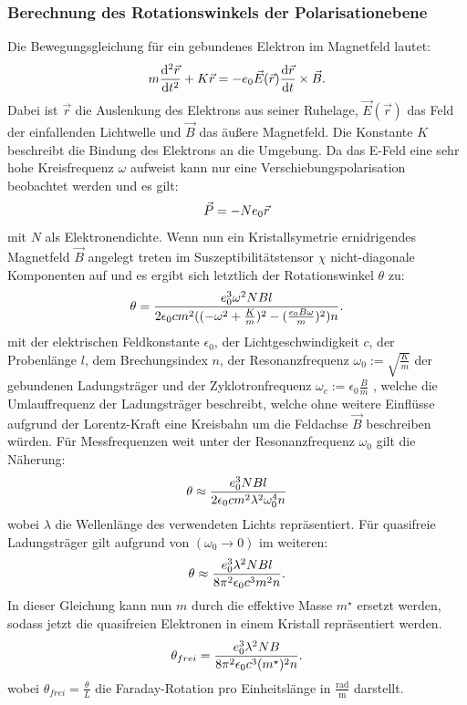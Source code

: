 \subsubsection{Berechnung des Rotationswinkels der Polarisationebene}
\label{sec:rotationsweinkel}
Die Bewegungsgleichung für ein gebundenes Elektron im Magnetfeld lautet:
\begin{equation}
  m\frac{\mathrm{d}^2 \vec{r}}{\mathrm{d}t^2}+K\vec{r}=-e_0\vec{E}(\vec{r})\frac{\mathrm{d} \vec{r}}{\mathrm{d}t}\times \vec{B}.\\
\end{equation}
Dabei ist $\vec{r}$ die Auslenkung des Elektrons aus seiner Ruhelage, $\vec{E}(\vec{r})$ das Feld der einfallenden Lichtwelle
und $\vec{B}$ das äußere Magnetfeld. Die Konstante $K$ beschreibt die Bindung des Elektrons an die Umgebung. Da das E-Feld eine
sehr hohe Kreisfrequenz $\omega$ aufweist kann nur eine Verschiebungspolarisation beobachtet werden und es gilt:
\begin{equation}
  \vec{P}=-Ne_0 \vec{r}\\
\end{equation} 
mit $N$ als Elektronendichte. Wenn nun ein Kristallsymetrie ernidrigendes Magnetfeld $\vec{B}$ angelegt treten im Suszeptibilitätstensor
$\chi$ nicht-diagonale Komponenten auf und es ergibt sich letztlich der Rotationswinkel $\theta$ zu:
\begin{equation}
  \theta = \frac{e_0^3 \omega^2 NBl}{2\epsilon_0 cm^2((-\omega^2+\frac{K}{m})^2-(\frac{e_0B\omega}{m})^2)n}.\\
\end{equation}
mit der elektrischen Feldkonstante $\epsilon_0$, der Lichtgeschwindigkeit $c$, der Probenlänge $l$, dem
Brechungsindex $n$, der Resonanzfrequenz $\omega_0:= \sqrt{\frac{K}{m}}$ der gebundenen Ladungsträger
und der Zyklotronfrequenz $\omega_c:=\epsilon_0\frac{B}{m}$ , welche die Umlauffrequenz der Ladungsträger
beschreibt, welche ohne weitere Einflüsse aufgrund der Lorentz-Kraft eine Kreisbahn um
die Feldachse $\vec{B}$ beschreiben würden. Für Messfrequenzen weit unter der Resonanzfrequenz
$\omega_0$ gilt die Näherung:
\begin{equation}
  \theta \approx \frac{e_0^3 NBl}{2\epsilon_0cm^2\lambda^2\omega_0^4n}\\
\end{equation}
wobei $\lambda$ die Wellenlänge des verwendeten Lichts repräsentiert. Für quasifreie Ladungsträger gilt aufgrund von $(\omega_0\rightarrow 0)$ im weiteren:
\begin{equation}
  \theta \approx \frac{e_0^3\lambda^2NBl}{8\pi^2\epsilon_0c^3m^2n}.\\
\end{equation}
In dieser Gleichung kann nun $m$ durch die effektive Masse $m^{\star}$ ersetzt werden, sodass jetzt  die quasifreien Elektronen in einem Kristall repräsentiert werden.
\begin{equation}
  \theta_{frei}=\frac{e_0^3\lambda^2NB}{8\pi^2\epsilon_0c^3(m^{\star})^2n}.\\
\end{equation}
wobei $\theta_{frei}=\frac{\theta}{L}$ die Faraday-Rotation pro Einheitslänge in $\frac{\mathrm{rad}}{\mathrm{m}}$ darstellt.